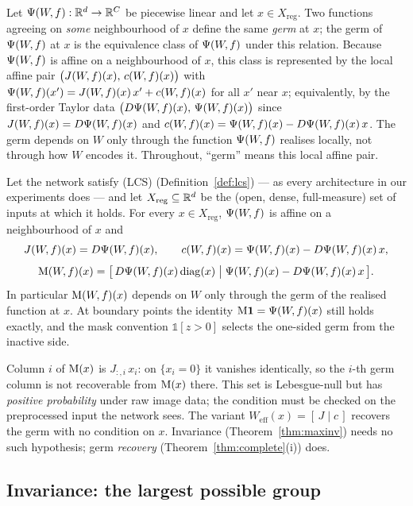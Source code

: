 \begin{definition}\label{def:germ}
Let $\Psi(W\!,f):\mathbb{R}^d\to\mathbb{R}^C$ be piecewise linear and let $x\in
X_{\mathrm{reg}}$. Two functions agreeing on \emph{some} neighbourhood of $x$
define the same \emph{germ} at $x$; the germ of $\Psi(W\!,f)$ at $x$ is the equivalence
class of $\Psi(W\!,f)$ under this relation. Because $\Psi(W\!,f)$ is affine on a neighbourhood
of $x$, this class is represented by the local affine pair
$\bigl(J(W\!,f)(x),\,c(W\!,f)(x)\bigr)$ with $\Psi(W\!,f)(x')=J(W\!,f)(x)\,x'+c(W\!,f)(x)$
for all $x'$ near $x$; equivalently, by the first-order Taylor data
$\bigl(D\Psi(W\!,f)(x),\,\Psi(W\!,f)(x)\bigr)$ since $J(W\!,f)(x)=D\Psi(W\!,f)(x)$ and
$c(W\!,f)(x)=\Psi(W\!,f)(x)-D\Psi(W\!,f)(x)\,x$.
The germ depends on $W$ only through the function $\Psi(W\!,f)$ realises
locally, not through how $W$ encodes it. Throughout, ``germ'' means this
local affine pair.
\end{definition}

\begin{theorem}\label{thm:germ}
Let the network satisfy (LCS) (Definition~\ref{def:lcs}) --- as every
architecture in our experiments does --- and let
$X_{\mathrm{reg}}\subseteq\mathbb{R}^d$ be the (open, dense, full-measure) set of
inputs at which it holds. For every $x\in
X_{\mathrm{reg}}$, $\Psi(W\!,f)$ is affine on a neighbourhood of $x$ and
\[
J(W\!,f)(x)=D\Psi(W\!,f)(x),\qquad c(W\!,f)(x)=\Psi(W\!,f)(x)-D\Psi(W\!,f)(x)\,x,
\]
\[
\mathrm{M}(W\!,f)(x)=\bigl[\,D\Psi(W\!,f)(x)\,\mathrm{diag}(x)\;\big|\;\Psi(W\!,f)(x)-D\Psi(W\!,f)(x)\,x\,\bigr].
\]
In particular $\mathrm{M}(W\!,f)(x)$ depends on $W$ only through the germ of the
realised function at $x$. At boundary points the identity
$\mathrm{M}\mathbf 1=\Psi(W\!,f)(x)$ still holds exactly, and the mask convention
$\mathbb 1[z>0]$ selects the one-sided germ from the inactive side.
\end{theorem}

\begin{remark}\label{rem:zero-pixels}
Column $i$ of $\mathrm{M}(x)$ is $J_{:,i}\,x_i$: on $\{x_i=0\}$ it vanishes
identically, so the $i$-th germ column is not recoverable from $\mathrm{M}(x)$ there.
This set is Lebesgue-null but has \emph{positive probability} under raw image
data; the condition must be checked on the preprocessed input the network
sees. The variant $W_{\mathrm{eff}}(x)=[\,J\mid c\,]$ recovers the germ with no
condition on $x$. Invariance (Theorem~\ref{thm:maxinv}) needs no such
hypothesis; germ \emph{recovery} (Theorem~\ref{thm:complete}(i)) does.
\end{remark}

\subsection{Invariance: the largest possible group}
\label{sec:invariance}

